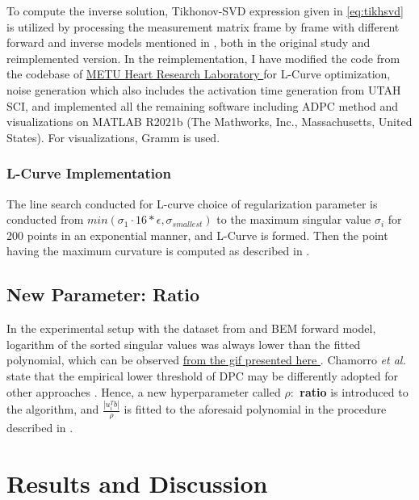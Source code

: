 \documentclass[draftcls, onecolumn, journal]{IEEEtran}
\begin{document}
To compute the inverse solution, Tikhonov-SVD expression given in \eqref{eq:tikhsvd} is utilized by processing the measurement matrix frame by frame with different forward and inverse models mentioned in , both in the original study and reimplemented version. In the reimplementation, I have modified the code from the codebase of \href{http://hrl.eee.metu.edu.tr/}{METU Heart Research Laboratory \faExternalLink*} for L-Curve optimization, noise generation which also includes the activation time generation from UTAH SCI\cite*{ActDetect}, and implemented all the remaining software including ADPC method and visualizations on MATLAB R2021b (The Mathworks, Inc., Massachusetts, United States). For visualizations, Gramm \cite*{morel2018gramm} is used. 

\subsubsection{L-Curve Implementation}

The line search conducted for L-curve choice of regularization parameter is conducted from $min(\sigma_1\cdot 16*\epsilon, \sigma_{smallest})$ to the maximum singular value $\sigma_i$ for 200 points in an exponential manner, and L-Curve is formed. Then the point having the maximum curvature is computed as described in \cite*{hansen1993use}.

\subsection{New Parameter: Ratio}

In the experimental setup with the dataset from \cite*{macleod1995electrocardiographic} and BEM forward model, logarithm of the sorted singular values was always lower than the fitted polynomial, which can be observed \href{https://github.com/kutay-ugurlu/Tikhonov-Regularization-Parameter-Selection-ECGI/tree/master}{from the gif presented here \faExternalLink*}. Chamorro \textit{et al.} state that the empirical lower threshold of DPC may be differently adopted for other approaches \cite*{chamorro2017improving}. Hence, a new hyperparameter called \textbf{$\rho:$ ratio} is introduced to the algorithm, and $\frac{|u_i^Tb|}{\rho}$ is fitted to the aforesaid polynomial in the procedure described in . 

\section{Results and Discussion}\label{sec:discussion}
\end{document}
